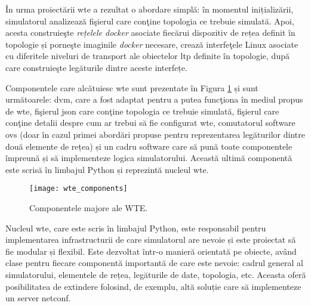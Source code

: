 În urma proiectării \gls{wte} a rezultat o abordare simplă: în momentul inițializării, simulatorul analizează fişierul care conţine topologia ce trebuie simulată. Apoi, acesta construieşte \textit{rețelele docker} asociate fiecărui dispozitiv de rețea definit în topologie și porneşte imaginile \textit{docker} necesare, crează interfeţele Linux asociate cu diferitele niveluri de transport ale obiectelor \gls{ltp} definite în topologie, după care construieşte legăturile dintre aceste interfețe.

Componentele care alcătuiesc \gls{wte} sunt prezentate în Figura \ref{fig:wte_components} și sunt următoarele: \gls{dvm}, care a fost adaptat pentru a putea funcţiona în mediul propus de \gls{wte}, fişierul \gls{json} care conţine topologia ce trebuie simulată, fişierul care conţine detalii despre cum ar trebui să fie configurat \gls{wte}, comutatorul software \gls{ovs} (doar în cazul primei abordări propuse pentru reprezentarea legăturilor dintre două elemente de rețea) și un cadru software care să pună toate componentele împreună și să implementeze logica simulatorului. Această ultimă componentă este scrisă în limbajul Python și reprezintă nucleul \gls{wte}.

\begin{figure}[h]
	\centering
	\texttt{[image: wte\_components]}
	\caption{Componentele majore ale WTE.}
	\label{fig:wte_components}
\end{figure}

Nucleul \gls{wte}, care este scris în limbajul Python, este responsabil pentru implementarea infrastructurii de care simulatorul are nevoie și este proiectat să fie modular și flexibil. Este dezvoltat într-o manieră orientată pe obiecte, având clase pentru fiecare componentă importantă de care este nevoie: cadrul general al simulatorului, elementele de rețea, legăturile de date, topologia, etc. Aceasta oferă posibilitatea de extindere folosind, de exemplu, altă soluție care să implementeze un server \gls{netconf}.